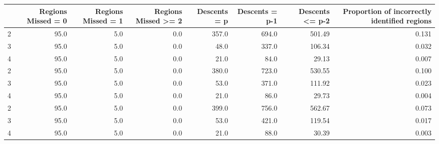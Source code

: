 \begin{tabular}{lrrrrrrr}
\toprule
{} &  Regions Missed = 0 &  Regions Missed = 1 &  Regions Missed >= 2 &  Descents = p &  Descents = p-1 &  Descents <= p-2 &  Proportion of incorrectly identified regions \\
\midrule
2 &                95.0 &                 5.0 &                  0.0 &         357.0 &           694.0 &           501.49 &                                         0.131 \\
3 &                95.0 &                 5.0 &                  0.0 &          48.0 &           337.0 &           106.34 &                                         0.032 \\
4 &                95.0 &                 5.0 &                  0.0 &          21.0 &            84.0 &            29.13 &                                         0.007 \\
2 &                95.0 &                 5.0 &                  0.0 &         380.0 &           723.0 &           530.55 &                                         0.100 \\
3 &                95.0 &                 5.0 &                  0.0 &          53.0 &           371.0 &           111.92 &                                         0.023 \\
4 &                95.0 &                 5.0 &                  0.0 &          21.0 &            86.0 &            29.73 &                                         0.004 \\
2 &                95.0 &                 5.0 &                  0.0 &         399.0 &           756.0 &           562.67 &                                         0.073 \\
3 &                95.0 &                 5.0 &                  0.0 &          53.0 &           421.0 &           119.54 &                                         0.017 \\
4 &                95.0 &                 5.0 &                  0.0 &          21.0 &            88.0 &            30.39 &                                         0.003 \\
\bottomrule
\end{tabular}
